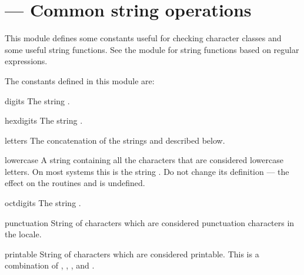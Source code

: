\section{ ---
         Common string operations}



This module defines some constants useful for checking character
classes and some useful string functions.  See the module
 for string functions based on regular
expressions.

The constants defined in this module are:

\begin{datadesc}{digits}
  The string .
\end{datadesc}

\begin{datadesc}{hexdigits}
  The string .
\end{datadesc}

\begin{datadesc}{letters}
  The concatenation of the strings  and
   described below.
\end{datadesc}

\begin{datadesc}{lowercase}
  A string containing all the characters that are considered lowercase
  letters.  On most systems this is the string
  .  Do not change its definition ---
  the effect on the routines  and
   is undefined.
\end{datadesc}

\begin{datadesc}{octdigits}
  The string .
\end{datadesc}

\begin{datadesc}{punctuation}
  String of \ASCII{} characters which are considered punctuation
  characters in the  locale.
\end{datadesc}

\begin{datadesc}{printable}
  String of characters which are considered printable.  This is a
  combination of , ,
  , and .
\end{datadesc}

